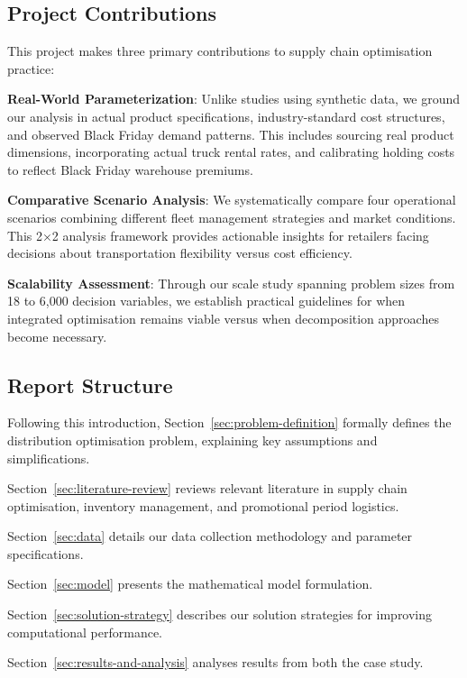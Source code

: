 \documentclass[a4paper,12pt]{article}
\begin{document}
\subsection{Project Contributions}\label{subsec:project-contributions}

This project makes three primary contributions to supply chain optimisation practice:

\textbf{Real-World Parameterization}: Unlike studies using synthetic data, we ground our analysis in actual product specifications, industry-standard cost structures, and observed Black Friday demand patterns.
This includes sourcing real product dimensions, incorporating actual truck rental rates, and calibrating holding costs to reflect Black Friday warehouse premiums.

\textbf{Comparative Scenario Analysis}: We systematically compare four operational scenarios combining different fleet management strategies and market conditions.
This 2×2 analysis framework provides actionable insights for retailers facing decisions about transportation flexibility versus cost efficiency.

\textbf{Scalability Assessment}: Through our scale study spanning problem sizes from 18 to 6,000 decision variables, we establish practical guidelines for when integrated optimisation remains viable versus when decomposition approaches become necessary.

\subsection{Report Structure}\label{subsec:report-structure}

Following this introduction, Section~\ref{sec:problem-definition} formally defines the distribution optimisation problem, explaining key assumptions and simplifications.

Section~\ref{sec:literature-review} reviews relevant literature in supply chain optimisation, inventory management, and promotional period logistics.

Section~\ref{sec:data} details our data collection methodology and parameter specifications.

Section~\ref{sec:model} presents the mathematical model formulation.

Section~\ref{sec:solution-strategy} describes our solution strategies for improving computational performance.

Section~\ref{sec:results-and-analysis} analyses results from both the case study.
\end{document}
